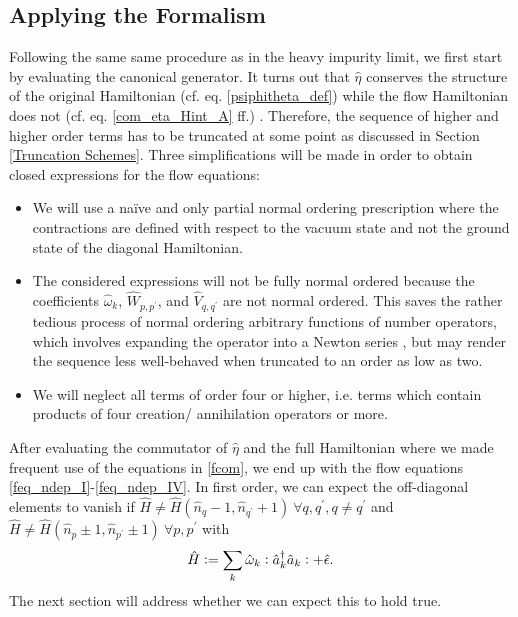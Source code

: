 \subsection{Applying the Formalism}
Following the same same procedure as in the heavy impurity limit, we first start by evaluating the canonical generator. It turns out that $\hat\eta$ conserves the structure of the original Hamiltonian (cf. eq. \ref{psiphitheta_def}) while the flow Hamiltonian does not (cf. eq. \ref{com_eta_Hint_A} ff.) . Therefore, the sequence of higher and higher order terms has to be truncated at some point as discussed in Section \ref{Truncation Schemes}. 
Three simplifications will be made in order to obtain closed expressions for the flow equations:
\begin{itemize}
\item We will use a na\"ive and only partial normal ordering prescription where the contractions are defined with respect to the vacuum state and not the ground state of the diagonal Hamiltonian.
\item The considered expressions will not be fully normal ordered because the coefficients $\hat\omega_k $, $\hat W_{p,p^\prime}$, and $\hat V_{q,q^\prime}$ are not normal ordered. This saves the rather tedious process of normal ordering arbitrary functions of number operators, which involves expanding the operator into a Newton series \cite{10.21468/SciPostPhys.10.1.007}, but may render the sequence less well-behaved when truncated to an order as low as two.
\item  We will neglect all terms of order four or higher, i.e. terms which contain products of four creation/ annihilation operators or more.
\end{itemize}
After evaluating the commutator of $\hat\eta$ and the full Hamiltonian where we made frequent use of the equations in \ref{fcom}, we end up with the flow equations \ref{feq_ndep_I}-\ref{feq_ndep_IV}. In first order, we can expect the off-diagonal elements to vanish if $\hat H \neq \hat H(\hat n_q-1,\hat n_{q^\prime}+1)\ \forall q,q^\prime,q\neq q^\prime$ and $\hat H \neq \hat H(\hat n_p\pm 1,\hat n_{p^\prime}\pm 1)\ \forall p,p^\prime$ with \begin{equation}\hat H\vcentcolon= \sum\limits_k \hat\omega_k \vcentcolon\hat a^\dagger_k\hat a_k\vcentcolon+\hat\epsilon. \end{equation}
The next section will address whether we can expect this to hold true.


